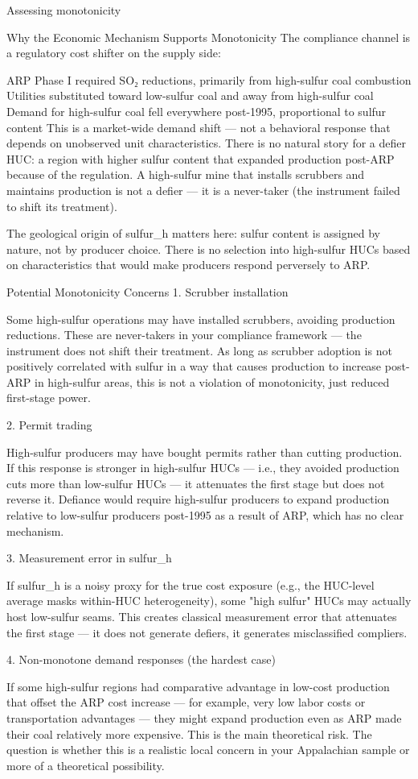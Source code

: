 \documentclass{beamer}
\begin{document}
\begin{frame}{Assessing monotonicity}

Why the Economic Mechanism Supports Monotonicity
The compliance channel is a regulatory cost shifter on the supply side:

ARP Phase I required SO₂ reductions, primarily from high-sulfur coal combustion
Utilities substituted toward low-sulfur coal and away from high-sulfur coal
Demand for high-sulfur coal fell everywhere post-1995, proportional to sulfur content
This is a market-wide demand shift — not a behavioral response that depends on unobserved unit characteristics. There is no natural story for a defier HUC: a region with higher sulfur content that expanded production post-ARP because of the regulation. A high-sulfur mine that installs scrubbers and maintains production is not a defier — it is a never-taker (the instrument failed to shift its treatment).

The geological origin of sulfur_h matters here: sulfur content is assigned by nature, not by producer choice. There is no selection into high-sulfur HUCs based on characteristics that would make producers respond perversely to ARP.

Potential Monotonicity Concerns
1. Scrubber installation

Some high-sulfur operations may have installed scrubbers, avoiding production reductions. These are never-takers in your compliance framework — the instrument does not shift their treatment. As long as scrubber adoption is not positively correlated with sulfur in a way that causes production to increase post-ARP in high-sulfur areas, this is not a violation of monotonicity, just reduced first-stage power.

2. Permit trading

High-sulfur producers may have bought permits rather than cutting production. If this response is stronger in high-sulfur HUCs — i.e., they avoided production cuts more than low-sulfur HUCs — it attenuates the first stage but does not reverse it. Defiance would require high-sulfur producers to expand production relative to low-sulfur producers post-1995 as a result of ARP, which has no clear mechanism.

3. Measurement error in sulfur_h

If sulfur_h is a noisy proxy for the true cost exposure (e.g., the HUC-level average masks within-HUC heterogeneity), some "high sulfur" HUCs may actually host low-sulfur seams. This creates classical measurement error that attenuates the first stage — it does not generate defiers, it generates misclassified compliers.

4. Non-monotone demand responses (the hardest case)

If some high-sulfur regions had comparative advantage in low-cost production that offset the ARP cost increase — for example, very low labor costs or transportation advantages — they might expand production even as ARP made their coal relatively more expensive. This is the main theoretical risk. The question is whether this is a realistic local concern in your Appalachian sample or more of a theoretical possibility.

\end{frame}
\end{document}
